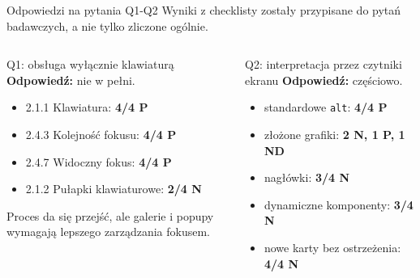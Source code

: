 \documentclass[aspectratio=169,11pt]{beamer}
\newcommand{\tagline}[1]{\textcolor{Slate}{\small #1}}
\begin{document}
\begin{frame}{Odpowiedzi na pytania Q1-Q2}
  \tagline{Wyniki z checklisty zostały przypisane do pytań badawczych, a nie tylko zliczone ogólnie.}

  \vspace{0.2cm}
  \small
  \begin{columns}[T,totalwidth=\textwidth]
      \begin{block}{Q1: obsługa wyłącznie klawiaturą}
        \textbf{Odpowiedź:} nie w pełni.

        \vspace{0.15cm}
        \begin{itemize}
          \item 2.1.1 Klawiatura: \textbf{4/4 P}
          \item 2.4.3 Kolejność fokusu: \textbf{4/4 P}
          \item 2.4.7 Widoczny fokus: \textbf{4/4 P}
          \item 2.1.2 Pułapki klawiaturowe: \textbf{2/4 N}
        \end{itemize}

        \vspace{0.1cm}
        \footnotesize Proces da się przejść, ale galerie i popupy wymagają lepszego zarządzania fokusem.
      \end{block}

      \begin{block}{Q2: interpretacja przez czytniki ekranu}
        \textbf{Odpowiedź:} częściowo.

        \vspace{0.15cm}
        \begin{itemize}
          \item standardowe \texttt{alt}: \textbf{4/4 P}
          \item złożone grafiki: \textbf{2 N, 1 P, 1 ND}
          \item nagłówki: \textbf{3/4 N}
          \item dynamiczne komponenty: \textbf{3/4 N}
          \item nowe karty bez ostrzeżenia: \textbf{4/4 N}
        \end{itemize}
      \end{block}
  \end{columns}
\end{frame}
\end{document}

